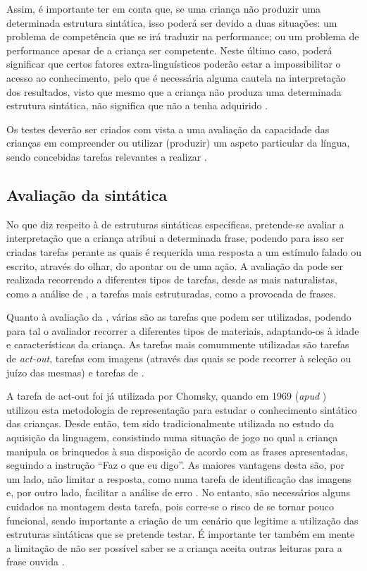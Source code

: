 \documentclass[output=paper]{LSP/langsci}
\begin{document}
Assim, é importante ter em conta que, se uma criança não produzir uma determinada estrutura sintática, isso poderá ser devido a duas situações: um problema de competência que se irá traduzir na performance; ou um problema de performance apesar de a criança ser competente. Neste último caso, poderá significar que certos fatores extra-linguísticos poderão estar a impossibilitar o acesso ao conhecimento, pelo que é necessária alguma cautela na interpretação dos resultados, visto que mesmo que a criança não produza uma determinada estrutura sintática, não significa que não a tenha adquirido \citep{valianaubry2005}. 

Os testes deverão ser criados com vista a uma avaliação da capacidade das crianças em compreender ou utilizar (produzir) um aspeto particular da língua, sendo concebidas tarefas relevantes a realizar \citep{peccei2006}.

\subsection{Avaliação da  sintática}
\label{subsec:martins_avaliacao_comp}

No que diz respeito à  de estruturas sintáticas específicas, pretende-se avaliar a interpretação que a criança atribui a determinada frase, podendo para isso ser criadas tarefas perante as quais é requerida uma resposta a um estímulo falado ou escrito, através do olhar, do apontar ou de uma ação. A avaliação da  pode ser realizada recorrendo a diferentes tipos de tarefas, desde as mais naturalistas, como a análise de , a tarefas mais estruturadas, como a  provocada de frases.

Quanto à avaliação da , várias são as tarefas que podem ser utilizadas, podendo para tal o avaliador recorrer a diferentes tipos de materiais, adaptando-os à idade e características da criança. As tarefas mais comummente utilizadas são tarefas de \textit{act-out}, tarefas com imagens (através das quais se pode recorrer à seleção ou juízo das mesmas) e tarefas de . 

A tarefa de act-out foi já utilizada por Chomsky, quando em 1969 (\textit{apud} \citealt{mcdaniel_etal1998}) utilizou esta metodologia de representação para estudar o conhecimento sintático das crianças. Desde então, tem sido tradicionalmente utilizada no estudo da aquisição da linguagem, consistindo numa situação de jogo no qual a criança manipula os brinquedos à sua disposição de acordo com as frases apresentadas, seguindo a instrução ``Faz o que eu digo''. As maiores vantagens desta são, por um lado, não limitar a resposta, como numa tarefa de identificação das imagens e, por outro lado, facilitar a análise de erro \citep{correa1995}. No entanto, são necessários alguns cuidados na montagem desta tarefa, pois corre-se o risco de se tornar pouco funcional, sendo importante a criação de um cenário que legitime a utilização das estruturas sintáticas que se pretende testar. É importante ter também em mente a limitação de não ser possível saber se a criança aceita outras leituras para a frase ouvida \citep{crainthornton1998}.
\end{document}
